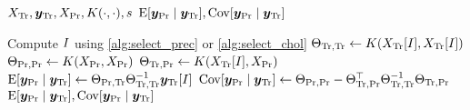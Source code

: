 \begin{algorithmic}[1]
  \REQUIRE \(
    X_{\text{Tr}}, \bm{y}_{\text{Tr}},
    X_{\text{Pr}}, K(\cdot, \cdot), s
  \)
  \ENSURE \(
      \operatorname{E}[\bm{y}_{\text{Pr}} \mid \bm{y}_{\text{Tr}}],
    \operatorname{Cov}[\bm{y}_{\text{Pr}} \mid \bm{y}_{\text{Tr}}]
  \)

  \STATE Compute \( I \) using \cref{alg:select_prec} or \cref{alg:select_chol}
  \STATE \(
    \Theta_{\text{Tr}, \text{Tr}} \gets
    K(X_{\text{Tr}}[I], X_{\text{Tr}}[I])
  \)
  \STATE \(
    \Theta_{\text{Pr}, \text{Pr}} \gets
    K(X_{\text{Pr}}, X_{\text{Pr}})
  \)
  \STATE \(
    \Theta_{\text{Tr}, \text{Pr}} \gets
    K(X_{\text{Tr}}[I], X_{\text{Pr}})
  \)
  \STATE \(
    \operatorname{E}[\bm{y}_{\text{Pr}} \mid \bm{y}_{\text{Tr}}] \gets
    \Theta_{\text{Pr}, \text{Tr}} \Theta_{\text{Tr}, \text{Tr}}^{-1}
    \bm{y}_{\text{Tr}}[I]
  \)
  \STATE \(
    \operatorname{Cov}[\bm{y}_{\text{Pr}} \mid \bm{y}_{\text{Tr}}] \gets
    \Theta_{\text{Pr}, \text{Pr}} -
    \Theta_{\text{Tr}, \text{Pr}}^{\top} \Theta_{\text{Tr}, \text{Tr}}^{-1}
    \Theta_{\text{Tr}, \text{Pr}}
  \)
  \RETURN \(
      \operatorname{E}[\bm{y}_{\text{Pr}} \mid \bm{y}_{\text{Tr}}],
    \operatorname{Cov}[\bm{y}_{\text{Pr}} \mid \bm{y}_{\text{Tr}}]
  \)
\end{algorithmic}
